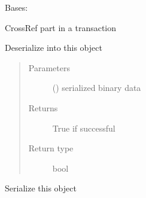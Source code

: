 \documentclass[letterpaper,10pt,english]{sphinxmanual}
\begin{document}
\begin{fulllineitems}
\label{\detokenize{bbc1.core.bbclib:bbc1.core.bbclib.BBcCrossRef}}
Bases: 

CrossRef part in a transaction

\begin{fulllineitems}
\label{\detokenize{bbc1.core.bbclib:bbc1.core.bbclib.BBcCrossRef.deserialize}}
Deserialize into this object
\begin{quote}\begin{description}
\item[{Parameters}] \leavevmode
{} () \textendash{} serialized binary data

\item[{Returns}] \leavevmode
True if successful

\item[{Return type}] \leavevmode
bool

\end{description}\end{quote}

\end{fulllineitems}


\begin{fulllineitems}
\label{\detokenize{bbc1.core.bbclib:bbc1.core.bbclib.BBcCrossRef.serialize}}
Serialize this object

\end{fulllineitems}


\end{fulllineitems}

\end{document}
